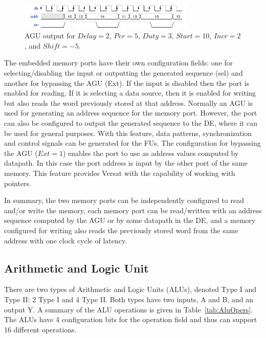 \begin{figure}[!htb]
\centering
\includegraphics[width=0.75\textwidth]{drawings/addrgen.png}
\caption{AGU output for $Delay=2$, $Per=5$, $Duty=3$, $Start=10$, $Incr=2$, and $Shift=-5$.}
\label{fig_addrgen}
\end{figure}

The embedded memory ports have their own configuration fields: one for
selecting/disabling the input or outputting the generated sequence
(sel) and another for bypassing the AGU (Ext). If the input is
disabled then the port is enabled for reading. If it is selecting a
data source, then it is enabled for writing but also reads the word
previously stored at that address. Normally an AGU is used for
generating an address sequence for the memory port. However, the port
can also be configured to output the generated sequence to the DE,
where it can be used for general purposes. With this feature, data
patterns, synchronization and control signals can be generated for the
FUs. The configuration for bypassing the AGU ($Ext=1$) enables the
port to use as address values computed by datapath. In this case the
port address is input by the other port of the same memory. This
feature provides Versat with the capability of working with pointers.

In summary, the two memory ports can be independently configured to
read and/or write the memory, each memory port can be read/written with
an address sequence computed by the AGU or by some datapath in the
DE, and a memory configured for writing also reads the previously
stored word from the same address with one clock cycle of latency.

\subsection{Arithmetic and Logic Unit}
\label{subsection:arithmeticLogicUnit}

There are two types of Arithmetic and Logic Units (ALUs), denoted Type
I and Type II: 2 Type I and 4 Type II. Both types have two inputs, A
and B, and an output Y.  A summary of the ALU operations is given in
Table~\ref{tab:AluOpers}. The ALUs have 4 configuration bits for the
operation field and thus can support 16 different operations.

